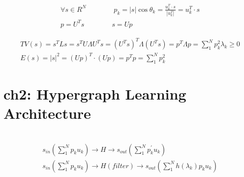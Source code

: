 \documentclass{article}
\begin{document}
%
\begin{align*}
    & \forall s \in R^{N} \qquad \qquad 
      p_{k} = |s| \cos \theta_{k} = 
      \frac{u_{k}^{T} \cdot s}{|u_{k}^{T}|} = 
      u_{k}^{T} \cdot s  \\[3pt]
    & p = U^{T} s \qquad \qquad s = U p 
\end{align*}

%
\begin{align*}
    & TV(s) = s^{T} L s = s^{T} U \Lambda U^{T} s = 
      ( U^{T} s )^{T} \Lambda ( U^{T} s ) = 
      p^{T} \Lambda p = \sum_{1}^{N} 
      p_{k}^{2} \lambda_{k} \ge 0  \\[3pt]
    & E(s) = |s|^{2} = ( U p )^{T} \cdot ( U p ) = 
      p^{T} p = \sum_{1}^{N} p_{k}^{2} 
\end{align*}

\newpage
\section*{ch2: Hypergraph Learning Architecture}


~ \\[3pt]
\begin{align*}
    & s_{in} \left ( \sum_{1}^{N} p_{k} {u_{k}} \right )
      \to H \to 
      s_{out} \left ( \sum_{1}^{N} p_{k}^{'} {u_{k}} \right )  \\[3pt]
    & s_{in} \left ( \sum_{1}^{N} p_{k} {u_{k}} \right )
      \to H(filter) \to 
      s_{out} \left ( \sum_{1}^{N} h(\lambda_{k}) p_{k} u_{k} \right )  \\[3pt]
\end{align*}
\end{document}
